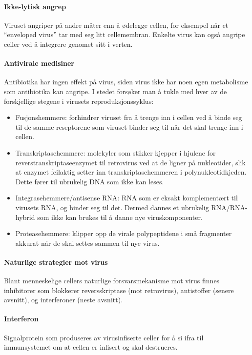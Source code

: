 \paragraph{Ikke-lytisk angrep} Viruset angriper på andre måter enn å ødelegge cellen, for eksempel når et ``enveloped virus'' tar med seg litt cellemembran. Enkelte virus kan også angripe celler ved å integrere genomet sitt i verten.

\paragraph{Antivirale medisiner} Antibiotika har ingen effekt på virus, siden virus ikke har noen egen metabolisme som antibiotika kan angripe. I stedet forsøker man å tukle med hver av de forskjellige stegene i virusets reproduksjonssyklus:
\begin{itemize}[noitemsep,nolistsep]
	\item Fusjonshemmere: forhindrer viruset fra å trenge inn i cellen ved å binde seg til de samme reseptorene som viruset binder seg til når det skal trenge inn i cellen.
	\item Transkriptasehemmere: molekyler som stikker kjepper i hjulene for reverstranskriptaseenzymet til retrovirus ved at de ligner på nukleotider, slik at enzymet feilaktig setter inn transkriptasehemmeren i polynukleotidkjeden. Dette fører til ubrukelig DNA som ikke kan leses.
	\item Integrasehemmere/antisense RNA: RNA som er eksakt komplementært til virusets RNA, og binder seg til det. Dermed dannes et ubrukelig RNA/RNA-hybrid som ikke kan brukes til å danne nye viruskomponenter.
	\item Proteasehemmere: klipper opp de virale polypeptidene i små fragmenter akkurat når de skal settes sammen til nye virus. 
\end{itemize}

\paragraph{Naturlige strategier mot virus} Blant menneskelige cellers naturlige forsvarsmekanisme mot virus finnes inhibitorer som blokkerer reversskriptase (mot retrovirus), antistoffer (senere avsnitt), og interferoner (neste avsnitt).

\paragraph{Interferon} Signalprotein som produseres av virusinfiserte celler for å si ifra til immunsystemet om at cellen er infisert og skal destrueres.

